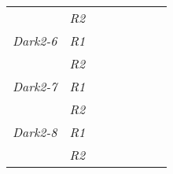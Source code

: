 \begin{table}[h]
\begin{tabular}{@{}|l|l|llllll@{}}
                     & \textit{R2}          &                                         &                                        &                                         &                                             &                       &                                          \\ \cmidrule(r){1-2}
\textit{Dark2-6}     & \textit{R1}          &                                         &                                        &                                         & \multicolumn{1}{l|}{}                       & \multicolumn{1}{l|}{} &                                          \\ \cmidrule(lr){2-2}
                     & \textit{R2}          &                                         &                                        &                                         &                                             &                       &                                          \\ \cmidrule(r){1-2}
\textit{Dark2-7}     & \textit{R1}          &                                         &                                        &                                         & \multicolumn{1}{l|}{}                       & \multicolumn{1}{l|}{} &                                          \\ \cmidrule(lr){2-2}
                     & \textit{R2}          &                                         &                                        &                                         &                                             &                       &                                          \\ \cmidrule(r){1-2}
\textit{Dark2-8}     & \textit{R1}          &                                         &                                        &                                         & \multicolumn{1}{l|}{}                       & \multicolumn{1}{l|}{} &                                          \\ \cmidrule(lr){2-2} \cmidrule(l){7-8} 
                     & \textit{R2}          &                                         &                                        &                                         &                                             &                       &                                          \\ \cmidrule(r){1-2}
\end{tabular}
\end{table}



